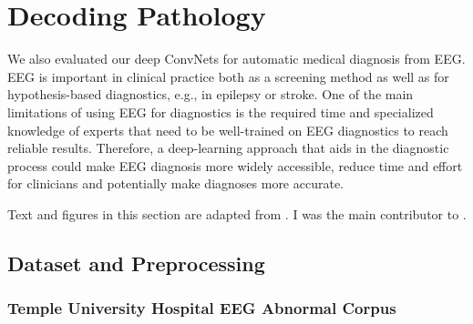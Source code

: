 \chapter{Decoding Pathology}\label{pathology}

    We also evaluated our deep ConvNets for automatic medical diagnosis from
EEG. EEG is important in clinical practice both as a screening method as
well as for hypothesis-based diagnostics, e.g., in epilepsy or stroke.
One of the main limitations of using EEG for diagnostics is the required
time and specialized knowledge of experts that need to be well-trained
on EEG diagnostics to reach reliable results. Therefore, a deep-learning
approach that aids in the diagnostic process could make EEG diagnosis
more widely accessible, reduce time and effort for clinicians and
potentially make diagnoses more accurate. 

Text and figures in this
section are adapted from \citet{schirrmeisterdeeppathology}.
I was the main contributor to
\citet{schirrmeisterdeeppathology}.

\section{Dataset and Preprocessing}\label{dataset-and-preprocessing}

\subsection{Temple University Hospital EEG Abnormal
Corpus}\label{temple-university-hospital-eeg-abnormal-corpus}


